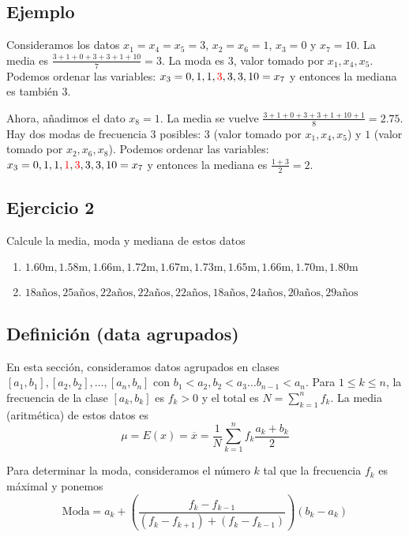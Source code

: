 \subsection{Ejemplo}

Consideramos los datos $x_1 = x_4 = x_5 = 3$, $x_2 = x_6 = 1$,
$x_3 = 0$ y $x_7 = 10$. La media es $\frac{3+1+0+3+3+1+10}{7} = 3$. La moda
es $3$, valor tomado por $x_1, x_4, x_5$. Podemos ordenar las variables:
$x_3 = 0, 1, 1, {\color{red}3}, 3, 3, 10 = x_7$ y entonces la mediana es también $3$.

Ahora, añadimos el dato $x_8 = 1$. La media se vuelve
$\frac{3+1+0+3+3+1+10+1}{8} = 2.75$. Hay dos modas de frecuencia $3$ posibles:
$3$ (valor tomado por $x_1, x_4, x_5$) y
$1$ (valor tomado por $x_2, x_6, x_8$). Podemos ordenar las variables:
$x_3 = 0, 1, 1, {\color{red} 1}, {\color{red} 3}, 3, 3, 10 = x_7$ y entonces
la mediana es $\frac{1+3}{2} = 2$.

\subsection{Ejercicio 2}

Calcule la media, moda y mediana de estos datos

\begin{enumerate}
\item $1.60\text{m}, 1.58\text{m}, 1.66\text{m}, 1.72\text{m}, 1.67\text{m}, 1.73\text{m}, 1.65\text{m}, 1.66\text{m}, 1.70\text{m}, 1.80\text{m}$
\item $18 \text{años}, 25 \text{años}, 22 \text{años},  \text{22} \text{años},
   \text{22} \text{años},  \text{18} \text{años},
   \text{24} \text{años},  \text{20} \text{años},  \text{29} \text{años}$
\end{enumerate}

\subsection{Definición (data agrupados)}

En esta sección, consideramos datos agrupados en clases
${[a_1, b_1]}, {[a_2, b_2]}, \ldots, {[a_n, b_n]}$ con
$b_1 < a_2, b_2 < a_3 \ldots b_{n-1} < a_n$. Para $1 \leq k \leq n$, la
frecuencia de la clase $[a_k, b_k]$ es $f_k > 0$ y el total es 
$N = \sum_{k=1}^n f_k$. La media (aritmética) de estos datos es
$$
\mu = E(x) =
\overline{x} = \frac{1}{N} \sum_{k=1}^n f_k \frac{a_k + b_k}{2}
$$

Para determinar la moda, consideramos el número $k$ tal que la frecuencia $f_k$ 
es máximal y ponemos
$$
\text{Moda}
= a_k + \left( \frac{f_{k} - f_{k-1}}{{(f_k - f_{k+1})} + {(f_{k} - f_{k-1})}}
\right) \left(b_k - a_k \right)
$$


